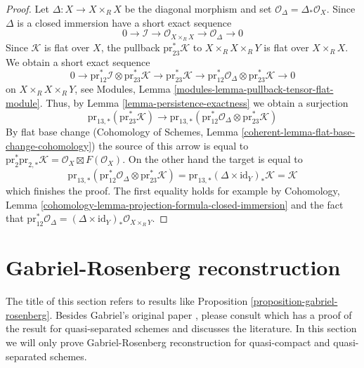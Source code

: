 \documentclass{stacks-project}
\theoremstyle{plain}
\theoremstyle{definition}
\theoremstyle{remark}
\numberwithin{equation}{subsection}
\begin{document}
\begin{proof}
Let $\Delta : X \to X \times_R X$ be the diagonal morphism and
set $\mathcal{O}_\Delta = \Delta_*\mathcal{O}_X$.
Since $\Delta$ is a closed immersion have a short exact sequence
$$
0 \to \mathcal{I} \to 
\mathcal{O}_{X \times_R X} \to \mathcal{O}_\Delta \to 0
$$
Since $\mathcal{K}$ is flat over $X$, the pullback
$\text{pr}_{23}^*\mathcal{K}$ to $X \times_R X \times_R Y$
is flat over $X \times_R X$. We obtain a short exact sequence
$$
0 \to 
\text{pr}_{12}^*\mathcal{I}
\otimes
\text{pr}_{23}^*\mathcal{K} \to
\text{pr}_{23}^*\mathcal{K} \to
\text{pr}_{12}^*\mathcal{O}_\Delta
\otimes
\text{pr}_{23}^*\mathcal{K} \to 0
$$
on $X \times_R X \times_R Y$, see
Modules, Lemma \ref{modules-lemma-pullback-tensor-flat-module}.
Thus, by Lemma \ref{lemma-persistence-exactness}
we obtain a surjection
$$
\text{pr}_{13, *}(\text{pr}_{23}^*\mathcal{K})
\to
\text{pr}_{13, *}(
\text{pr}_{12}^*\mathcal{O}_\Delta
\otimes
\text{pr}_{23}^*\mathcal{K})
$$
By flat base change
(Cohomology of Schemes, Lemma \ref{coherent-lemma-flat-base-change-cohomology})
the source of this arrow is equal to $\text{pr}_2^*\text{pr}_{2, *}\mathcal{K}
= \mathcal{O}_X \boxtimes F(\mathcal{O}_X)$. On the other hand the target is
equal to
$$
\text{pr}_{13, *}(
\text{pr}_{12}^*\mathcal{O}_\Delta
\otimes
\text{pr}_{23}^*\mathcal{K}) =
\text{pr}_{13, *} (\Delta \times \text{id}_Y)_* \mathcal{K} =
\mathcal{K}
$$
which finishes the proof. The first equality holds for example by
Cohomology, Lemma \ref{cohomology-lemma-projection-formula-closed-immersion}
and the fact that $\text{pr}_{12}^*\mathcal{O}_\Delta =
(\Delta \times \text{id}_Y)_*\mathcal{O}_{X \times_R Y}$.
\end{proof}










\section{Gabriel-Rosenberg reconstruction}
\label{section-gabriel}

\noindent
The title of this section refers to results like
Proposition \ref{proposition-gabriel-rosenberg}.
Besides Gabriel's original paper \cite{Gabriel}, please consult
\cite{Brandenburg} which has a proof of the result for quasi-separated schemes
and discusses the literature. In this section we will only prove
Gabriel-Rosenberg reconstruction for quasi-compact and quasi-separated schemes.
\end{document}
